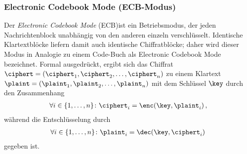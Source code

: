\subsubsection{Electronic Codebook Mode (ECB-Modus)}\label{sssec:ecb}
Der \emph{Electronic Codebook Mode} (ECB)\indexECB ist ein
Betriebsmodus, der jeden Nachrichtenblock unabhängig von den anderen
einzeln verschlüsselt. Identische Klartextblöcke liefern damit auch
identische Chiffratblöcke; daher wird dieser Modus in Analogie zu einem
Code-Buch als Electronic Codebook Mode bezeichnet. Formal ausgedrückt,
ergibt sich das Chiffrat $\ciphert =
(\ciphert_{1},\ciphert_{2},\dots,\ciphert_{n})$ zu einem Klartext
$\plaint = (\plaint_{1},\plaint_{2},\dots,\plaint_{n})$ mit dem
Schlüssel $\key$ durch den Zusammenhang 
\begin{align*}
  \forall i \in \{1,\dots,n\}\colon \ciphert_{i} = \enc(\key,\plaint_{i})\, ,
\end{align*}
während die Entschlüsselung durch
\begin{align*}
  \forall i \in \{1,\dots,n\}\colon \plaint_{i} = \dec(\key,\ciphert_{i})\, 
\end{align*}
gegeben ist.
